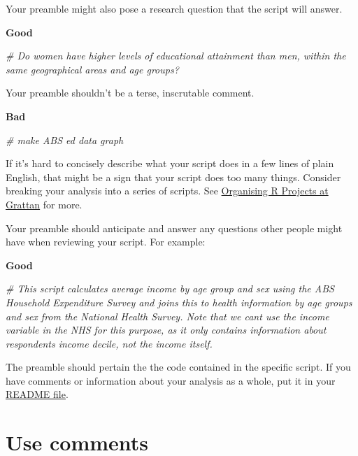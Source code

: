 \documentclass[
]{book}
\newenvironment{Shaded}{\begin{snugshade}}{\end{snugshade}}
\newcommand{\CommentTok}[1]{\textcolor[rgb]{0.56,0.35,0.01}{\textit{#1}}}
\begin{document}
Your preamble might also pose a research question that the script will answer.

\textbf{Good}

\begin{Shaded}
\begin{Highlighting}[]
\CommentTok{\# Do women have higher levels of educational attainment than men, within the same geographical areas and age groups?}
\end{Highlighting}
\end{Shaded}

Your preamble shouldn't be a terse, inscrutable comment.

\textbf{Bad}

\begin{Shaded}
\begin{Highlighting}[]
\CommentTok{\# make ABS ed data graph}
\end{Highlighting}
\end{Shaded}

If it's hard to concisely describe what your script does in a few lines of plain English, that might be a sign that your script does too many things. Consider breaking your analysis into a series of scripts. See \protect\hyperlink{organising-projects}{Organising R Projects at Grattan} for more.

Your preamble should anticipate and answer any questions other people might have when reviewing your script. For example:

\textbf{Good}

\begin{Shaded}
\begin{Highlighting}[]
\CommentTok{\# This script calculates average income by age group and sex using the ABS Household Expenditure Survey and joins this to health information by age groups and sex from the National Health Survey. Note that we can\textquotesingle{}t use the income variable in the NHS for this purpose, as it only contains information about respondents\textquotesingle{} income decile, not the income itself.}
\end{Highlighting}
\end{Shaded}

The preamble should pertain the the code contained in the specific script. If you have comments or information about your analysis as a whole, put it in your \protect\hyperlink{README}{README file}.

\hypertarget{use-comments}{%
\section{Use comments}\label{use-comments}}
\end{document}
